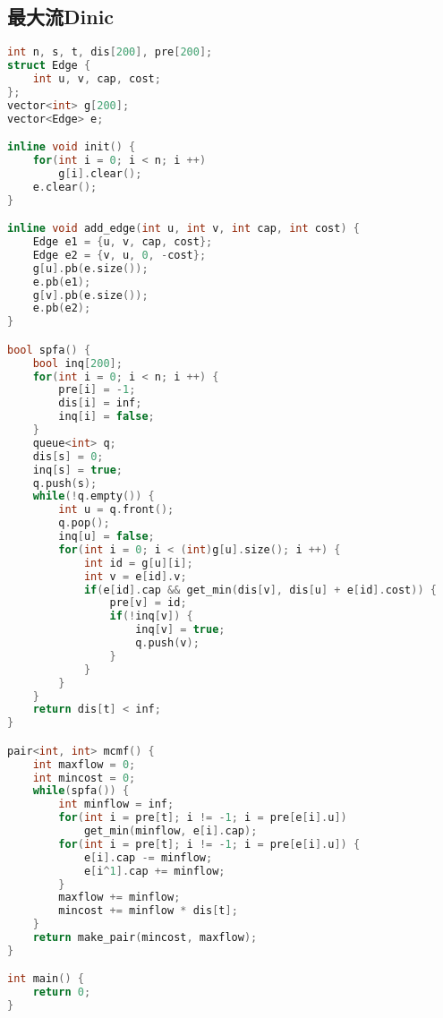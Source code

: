 \subsection{最大流Dinic}
    \begin{lstlisting}[language=c++]
int n, s, t, dis[200], pre[200];
struct Edge {
    int u, v, cap, cost;
};
vector<int> g[200];
vector<Edge> e;

inline void init() {
    for(int i = 0; i < n; i ++)
        g[i].clear();
    e.clear();
}

inline void add_edge(int u, int v, int cap, int cost) {
    Edge e1 = {u, v, cap, cost};
    Edge e2 = {v, u, 0, -cost};
    g[u].pb(e.size());
    e.pb(e1);
    g[v].pb(e.size());
    e.pb(e2);
}

bool spfa() {
    bool inq[200];
    for(int i = 0; i < n; i ++) {
        pre[i] = -1;
        dis[i] = inf;
        inq[i] = false;
    }
    queue<int> q;
    dis[s] = 0;
    inq[s] = true;
    q.push(s);
    while(!q.empty()) {
        int u = q.front();
        q.pop();
        inq[u] = false;
        for(int i = 0; i < (int)g[u].size(); i ++) {
            int id = g[u][i];
            int v = e[id].v;
            if(e[id].cap && get_min(dis[v], dis[u] + e[id].cost)) {
                pre[v] = id;
                if(!inq[v]) {
                    inq[v] = true;
                    q.push(v);
                }
            }
        }
    }
    return dis[t] < inf;
}

pair<int, int> mcmf() {
    int maxflow = 0;
    int mincost = 0;
    while(spfa()) {
        int minflow = inf;
        for(int i = pre[t]; i != -1; i = pre[e[i].u]) 
            get_min(minflow, e[i].cap);
        for(int i = pre[t]; i != -1; i = pre[e[i].u]) {
            e[i].cap -= minflow;
            e[i^1].cap += minflow;
        }
        maxflow += minflow;
        mincost += minflow * dis[t];
    }
    return make_pair(mincost, maxflow);
}

int main() {
    return 0;
}
    \end{lstlisting}
